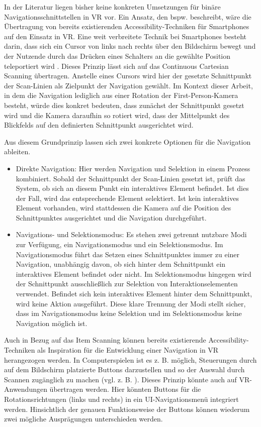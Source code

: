 In der Literatur liegen bisher keine konkreten Umsetzungen für binäre Navigationsschnittstellen in VR vor. Ein Ansatz, den bspw. \citet{wentzel_bring-your-own_2023} beschreibt, wäre die Übertragung von bereits existierenden Accessibility-Techniken für Smartphones auf den Einsatz in VR. Eine weit verbreitete Technik bei Smartphones besteht darin, dass sich ein Cursor von links nach rechts über den Bildschirm bewegt und der Nutzende durch das Drücken eines Schalters an die gewählte Position teleportiert wird \citep{wentzel_bring-your-own_2023}. Dieses Prinzip lässt sich auf das Continuous Cartesian Scanning übertragen. Anstelle eines Cursors wird hier der gesetzte Schnittpunkt der Scan-Linien als Zielpunkt der Navigation gewählt. Im Kontext dieser Arbeit, in dem die Navigation lediglich aus einer Rotation der First-Person-Kamera besteht, würde dies konkret bedeuten, dass zunächst der Schnittpunkt gesetzt wird und die Kamera daraufhin so rotiert wird, dass der Mittelpunkt des Blickfelds auf den definierten Schnittpunkt ausgerichtet wird. 

Aus diesem Grundprinzip lassen sich zwei konkrete Optionen für die Navigation ableiten.

\begin{itemize}
    \item Direkte Navigation: Hier werden Navigation und Selektion in einem Prozess kombiniert. Sobald der Schnittpunkt der Scan-Linien gesetzt ist, prüft das System, ob sich an diesem Punkt ein interaktives Element befindet. Ist dies der Fall, wird das entsprechende Element selektiert. Ist kein interaktives Element vorhanden, wird stattdessen die Kamera auf die Position des Schnittpunktes ausgerichtet und die Navigation durchgeführt.
    \item Navigations- und Selektionsmodus: Es stehen zwei getrennt nutzbare Modi zur Verfügung, ein Navigationsmodus und ein Selektionsmodus. Im Navigationsmodus führt das Setzen eines Schnittpunktes immer zu einer Navigation, unabhängig davon, ob sich hinter dem Schnittpunkt ein interaktives Element befindet oder nicht. Im Selektionsmodus hingegen wird der Schnittpunkt ausschließlich zur Selektion von Interaktionselementen verwendet. Befindet sich kein interaktives Element hinter dem Schnittpunkt, wird keine Aktion ausgeführt. Diese klare Trennung der Modi stellt sicher, dass im Navigationsmodus keine Selektion und im Selektionsmodus keine Navigation möglich ist.
\end{itemize}

Auch in Bezug auf das Item Scanning können bereits existierende Accessibility-Techniken als Inspiration für die Entwicklung einer Navigation in VR herangezogen werden. In Computerspielen ist es z. B. möglich, Steuerungen durch auf dem Bildschirm platzierte Buttons darzustellen und so der Auswahl durch Scannen zugänglich zu machen (vgl. z. B. \citep{10.1145/2159365.2159386, trewin_exploring_2009}).  
Dieses Prinzip könnte auch auf VR-Anwendungen übertragen werden. Hier könnten Buttons für die Rotationsrichtungen (links und rechts) in ein UI-Navigationsmenü integriert werden.  Hinsichtlich der genauen Funktionsweise der Buttons können wiederum zwei mögliche Ausprägungen unterschieden werden. 

